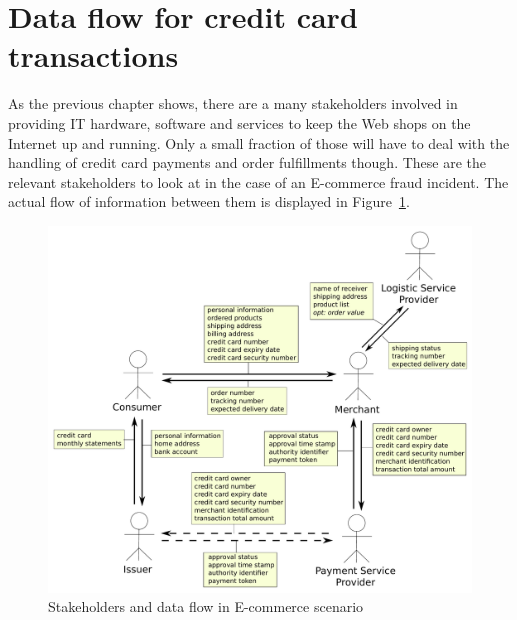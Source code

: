 
\section{Data flow for credit card transactions}
\label{sec:stakeholder_data_flow}

As the previous chapter shows, there are a many stakeholders involved in providing \gls{IT} hardware, software and services to keep the Web shops on the Internet up and running. Only a small fraction of those will have to deal with the handling of credit card payments and order fulfillments though. These are the relevant stakeholders to look at in the case of an \gls{E-commerce} fraud incident. The actual flow of information between them is displayed in  Figure~\ref{fig:images_e_commerce_stakeholder}. \@

\begin{figure}[H]
	\centering
		\includegraphics[width=0.9\columnwidth]{images/e-commerce-stakeholder.pdf}
	\caption{Stakeholders and data flow in \gls{E-commerce} scenario}
\label{fig:images_e_commerce_stakeholder}
\end{figure}
